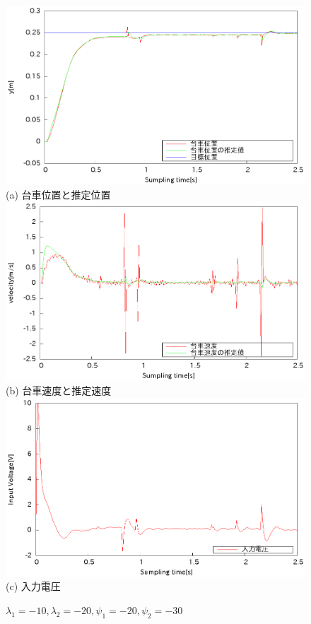 \documentclass[11pt,a4paper]{jsarticle}
\begin{document}
 \newpage
 \begin{figure}[H]
  \begin{center}
   \includegraphics[scale = .8]{./picture/exp6.eps} \\
   (a) 台車位置と推定位置 \\
   \includegraphics[scale = .8]{./picture/exp6_2.eps} \\
   (b) 台車速度と推定速度 \\
   \includegraphics[scale = .8]{./picture/exp6_3.eps} \\
   (c) 入力電圧
  \end{center}
  \caption{$\lambda_1 = -10,\lambda_2 = -20, \psi_1 = -20,\psi_2 = -30$}
 \end{figure}
\end{document}
